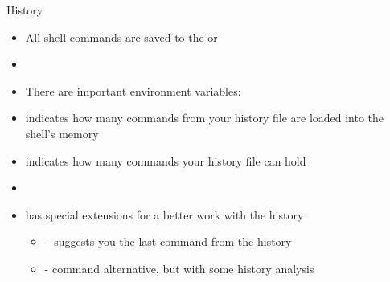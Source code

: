 \documentclass[usenames,dvipsnames,10pt,aspectratio=169]{beamer}
\begin{document}
\begin{frame}{History}
    \begin{itemize}
        \item All shell commands are saved to the  or 
        \item {}
        \item There are important environment variables:
        \item {} indicates how many commands from your history file are loaded into the shell's memory
        \item {} indicates how many commands your history file can hold
        \item {}
        \item {} has special extensions for a better work with the history
        \begin{itemize}
            \item {} -- suggests you the last command from the history 
            \item {} -  command alternative, but with some history analysis
        \end{itemize}
    \end{itemize}
\end{frame}
\end{document}
